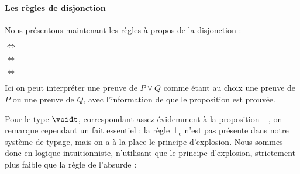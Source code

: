 \paragraph{Les règles de disjonction}

Nous présentons maintenant les règles à propos de la disjonction :

\begin{center}
    \begin{prooftree}
    \end{prooftree}
    \quad $\iff$ \quad
    \begin{prooftree}
    \end{prooftree}

    \vspace{0.5cm}

    \begin{prooftree}
    \end{prooftree}
    \quad $\iff$ \quad
    \begin{prooftree}
    \end{prooftree}

    \vspace{0.5cm}

    \begin{prooftree}
    \end{prooftree}
    \quad $\iff$ \quad
    \begin{prooftree}
    \end{prooftree}
\end{center}

Ici on peut interpréter une preuve de $P\lor Q$ comme étant au choix une preuve de $P$ ou une preuve de $Q$, avec l'information de quelle proposition est prouvée.

Pour le type $\voidt$, correspondant assez évidemment à la proposition $\bot$, on remarque cependant un fait essentiel : la règle $\bot_\mathrm c$ n'est pas présente dans notre système de typage, mais on a à la place le principe d'explosion. Nous sommes donc en logique intuitionniste, n'utilisant que le principe d'explosion, strictement plus faible que la règle de l'absurde :

